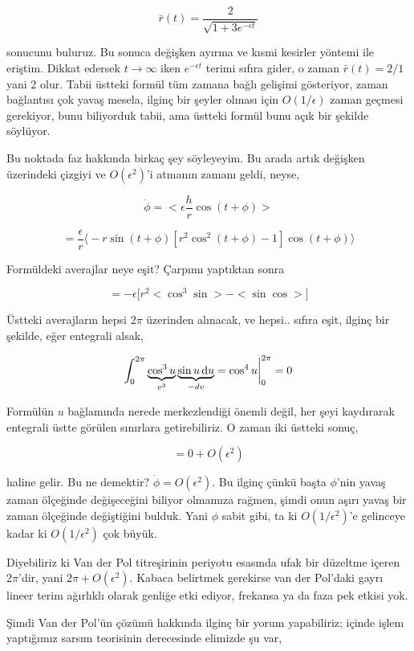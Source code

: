 \documentclass[12pt,fleqn]{article}\usepackage{../../common}
\begin{document}
$$ \bar{r}(t) = \frac{2}{\sqrt{ 1 + 3 e^{-\epsilon t}}} $$

sonucunu buluruz. Bu sonuca değişken ayırma ve kısmi kesirler yöntemi ile
eriştim. Dikkat edersek $t \to \infty$ iken $e^{-\epsilon t}$ terimi sıfıra
gider, o zaman $\bar{r}(t) = 2/1$ yani 2 olur. Tabii üstteki formül tüm zamana
bağlı gelişimi gösteriyor, zaman bağlantısı çok yavaş mesela, ilginç bir şeyler
olması için $O(1/\epsilon)$ zaman geçmesi gerekiyor, bunu biliyorduk tabii, ama
üstteki formül bunu açık bir şekilde söylüyor.

Bu noktada faz hakkında birkaç şey söyleyeyim. Bu arada artık değişken
üzerindeki çizgiyi ve $O(\epsilon^2)$'i atmanın zamanı geldi, neyse,

$$ \dot{\phi} = < \epsilon \frac{h}{r} \cos(t+\phi) > $$

$$ = \frac{\epsilon}{r}
\bigl\langle
-r \sin (t+\phi) [r^2 \cos^2 (t+\phi) - 1] \cos (t+\phi)
\bigr\rangle
$$

Formüldeki averajlar neye eşit? Çarpımı yaptıktan sonra

$$ = -\epsilon \big[ r^2 < \cos^3 \sin > - < \sin \cos > \big]
$$

Üstteki averajların hepsi $2\pi$ üzerinden alınacak, ve hepsi.. sıfıra eşit,
ilginç bir şekilde, eğer entegrali alsak,

$$ \int _{0}^{2\pi}
\underbrace{\cos^3 u}_{v^3}
\underbrace{\sin u \,\mathrm{d} u}_{-dv}  = \cos^4 u \biggr|_{0}^{2\pi}  = 0$$

Formülün $u$ bağlamında nerede merkezlendiği önemli değil, her şeyi kaydırarak
entegrali üstte görülen sınırlara getirebiliriz. O zaman iki üstteki sonuç,

$$ = 0 + O(\epsilon^2)
$$

haline gelir. Bu ne demektir? $\dot{\phi} = O(\epsilon^2)$. Bu ilginç çünkü
başta $\phi$'nin yavaş zaman ölçeğinde değişeceğini biliyor olmamıza rağmen,
şimdi onun aşırı yavaş bir zaman ölçeğinde değiştiğini bulduk. Yani $\phi$ sabit
gibi, ta ki $O(1/\epsilon^2)$'e gelinceye kadar ki $O(1/\epsilon^2)$ çok büyük. 

Diyebiliriz ki Van der Pol titreşirinin periyotu esasında ufak bir düzeltme
içeren $2\pi$'dir, yani $2\pi + O(\epsilon^2)$. Kabaca belirtmek gerekirse
van der Pol'daki gayrı lineer terim ağırlıklı olarak genliğe etki ediyor,
frekansa ya da faza pek etkisi yok.

Şimdi Van der Pol'ün çözümü hakkında ilginç bir yorum yapabiliriz; içinde işlem
yaptığımız sarsım teorisinin derecesinde elimizde şu var,
\end{document}
